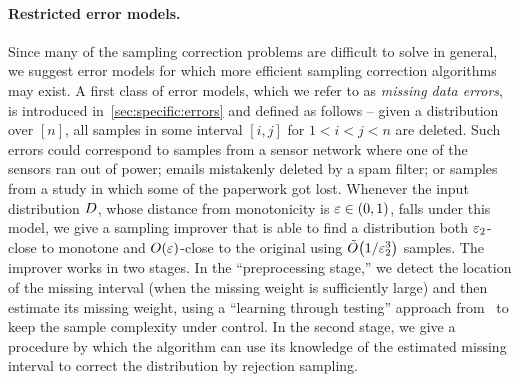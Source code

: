 \paragraph{Restricted error models.}
Since many of the sampling correction problems are 
difficult to solve in general, we suggest error models
for which more efficient sampling correction algorithms
may exist. A first class of error models, which we refer to
as  \emph{missing data errors}, is introduced in~\autoref{sec:specific:errors} and defined as follows -- given a distribution
over $[n]$, all samples in some interval $[i,j]$ for $1<i<j<n$ are
deleted.  Such errors could correspond to samples from a sensor
network where one of the sensors ran out of power; 
emails mistakenly deleted by a spam filter; or samples
from a study in which some of the paperwork got lost.
Whenever the input distribution $D$, 
whose distance from monotonicity is {$\varepsilon\in(0,1)$}, 
falls under this model, we give a sampling improver that is able to find 
a distribution both $\varepsilon_2$-close to monotone
 and $\bigO{\eps}$-close to the original 
using $\tildeO{{1}/{\eps_2^{3}}}$ samples. 
The improver works in two stages. In the ``preprocessing stage,'' 
 we detect the location of the missing interval 
(when the missing weight is sufficiently large) 
and then estimate its missing weight, using a 
``learning through testing'' approach from~\cite{DDS:12} to keep the sample complexity under control. 
In the second stage, 
we give a procedure 
by which the algorithm can use its knowledge
of the estimated missing interval to
 correct the distribution by rejection sampling.
 

